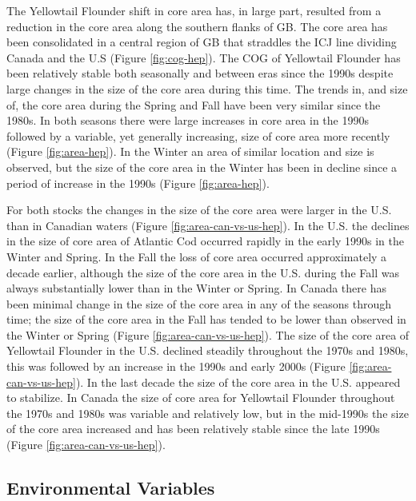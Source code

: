 \documentclass[
]{article}
\begin{document}
The Yellowtail Flounder shift in core area has, in large part, resulted from a reduction in the core area along the southern flanks of GB. The core area has been consolidated in a central region of GB that straddles the ICJ line dividing Canada and the U.S (Figure \ref{fig:cog-hep}). The COG of Yellowtail Flounder has been relatively stable both seasonally and between eras since the 1990s despite large changes in the size of the core area during this time. The trends in, and size of, the core area during the Spring and Fall have been very similar since the 1980s. In both seasons there were large increases in core area in the 1990s followed by a variable, yet generally increasing, size of core area more recently (Figure \ref{fig:area-hep}). In the Winter an area of similar location and size is observed, but the size of the core area in the Winter has been in decline since a period of increase in the 1990s (Figure \ref{fig:area-hep}).

For both stocks the changes in the size of the core area were larger in the U.S. than in Canadian waters (Figure \ref{fig:area-can-vs-us-hep}). In the U.S. the declines in the size of core area of Atlantic Cod occurred rapidly in the early 1990s in the Winter and Spring. In the Fall the loss of core area occurred approximately a decade earlier, although the size of the core area in the U.S. during the Fall was always substantially lower than in the Winter or Spring. In Canada there has been minimal change in the size of the core area in any of the seasons through time; the size of the core area in the Fall has tended to be lower than observed in the Winter or Spring (Figure \ref{fig:area-can-vs-us-hep}). The size of the core area of Yellowtail Flounder in the U.S. declined steadily throughout the 1970s and 1980s, this was followed by an increase in the 1990s and early 2000s (Figure \ref{fig:area-can-vs-us-hep}). In the last decade the size of the core area in the U.S. appeared to stabilize. In Canada the size of core area for Yellowtail Flounder throughout the 1970s and 1980s was variable and relatively low, but in the mid-1990s the size of the core area increased and has been relatively stable since the late 1990s (Figure \ref{fig:area-can-vs-us-hep}).

\hypertarget{environmental-variables}{%
\subsection{Environmental Variables}\label{environmental-variables}}
\end{document}
